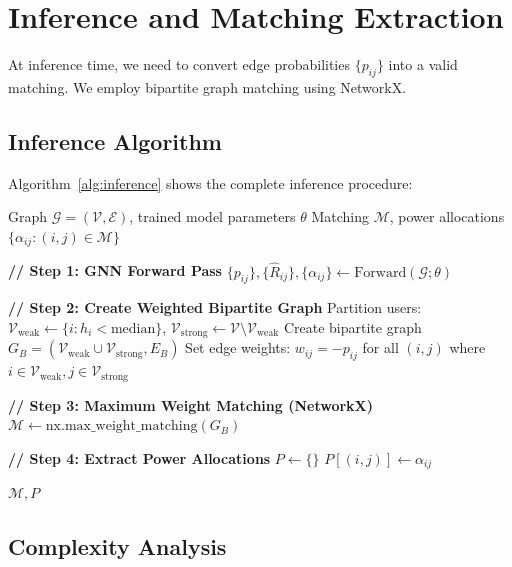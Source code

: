 \section{Inference and Matching Extraction}

At inference time, we need to convert edge probabilities $\{p_{ij}\}$ into a valid matching. We employ bipartite graph matching using NetworkX.

\subsection{Inference Algorithm}

Algorithm~\ref{alg:inference} shows the complete inference procedure:

\begin{algorithm}[H]
\caption{NOMA-GNN Inference}
\label{alg:inference}
\begin{algorithmic}[1]
\Require Graph $\mathcal{G} = (\mathcal{V}, \mathcal{E})$, trained model parameters $\theta$
\Ensure Matching $\mathcal{M}$, power allocations $\{\alpha_{ij} : (i,j) \in \mathcal{M}\}$

\State \textbf{// Step 1: GNN Forward Pass}
\State $\{p_{ij}\}, \{\hat{R}_{ij}\}, \{\alpha_{ij}\} \leftarrow \text{Forward}(\mathcal{G}; \theta)$

\State \textbf{// Step 2: Create Weighted Bipartite Graph}
\State Partition users: $\mathcal{V}_{\text{weak}} \leftarrow \{i : h_i < \text{median}\}$, $\mathcal{V}_{\text{strong}} \leftarrow \mathcal{V} \setminus \mathcal{V}_{\text{weak}}$
\State Create bipartite graph $G_B = (\mathcal{V}_{\text{weak}} \cup \mathcal{V}_{\text{strong}}, E_B)$
\State Set edge weights: $w_{ij} = -p_{ij}$ for all $(i,j)$ where $i \in \mathcal{V}_{\text{weak}}, j \in \mathcal{V}_{\text{strong}}$

\State \textbf{// Step 3: Maximum Weight Matching (NetworkX)}
\State $\mathcal{M} \leftarrow \text{nx.max\_weight\_matching}(G_B)$

\State \textbf{// Step 4: Extract Power Allocations}
\State $P \leftarrow \{\}$
    \State $P[(i,j)] \leftarrow \alpha_{ij}$
\EndFor

\State \Return $\mathcal{M}, P$
\end{algorithmic}
\end{algorithm}

\subsection{Complexity Analysis}

